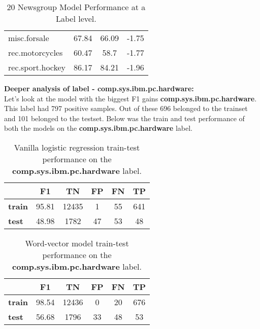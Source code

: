 \begin{table}[htbp]
\begin{tabular}{l|c|c|c|}
misc.forsale               & 67.84                                                            & 66.09                                                        & -1.75                                                             \\
rec.motorcycles            & 60.47                                                            & 58.7                                                         & -1.77                                                             \\
rec.sport.hockey           & 86.17                                                            & 84.21                                                        & -1.96                                                            
\end{tabular}
\caption{\label{tab:widgets}20 Newsgroup Model Performance at a Label level.}
\end{table}

\noindent \textbf{Deeper analysis of label - comp.sys.ibm.pc.hardware:}\\

Let's look at the model with the biggest F1 gains \textbf{comp.sys.ibm.pc.hardware}. This label had 797 positive samples. Out of these 696 belonged to the trainset and 101 belonged to the testset. Below was the train and test performance of both the models on the \textbf{comp.sys.ibm.pc.hardware} label.

\begin{table}[htbp]
\centering
\begin{tabular}{l|c|c|c|c|c|}
 & \textbf{F1} & \textbf{TN} & \textbf{FP} & \textbf{FN} & \textbf{TP} \\ \hline
\textbf{train} & 95.81 & 12435 & 1 & 55 & 641 \\
\textbf{test} & 48.98 & 1782 & 47 & 53 & 48
\end{tabular}
\caption{\label{tab:widgets}Vanilla logistic regression train-test performance on the \textbf{comp.sys.ibm.pc.hardware} label.}
\end{table}

\begin{table}[htbp]
\centering
\begin{tabular}{l|c|c|c|c|c|}
 & \textbf{F1} & \textbf{TN} & \textbf{FP} & \textbf{FN} & \textbf{TP} \\ \hline
\textbf{train} & 98.54 & 12436 & 0 & 20 & 676 \\
\textbf{test} & 56.68 & 1796 & 33 & 48 & 53
\end{tabular}
\caption{\label{tab:widgets}Word-vector model train-test performance on the \textbf{comp.sys.ibm.pc.hardware} label.}
\end{table}

